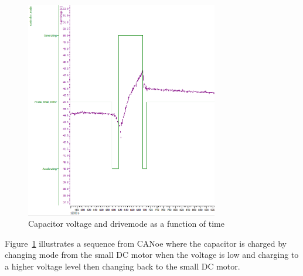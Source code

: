 \begin{figure}[H]
    \centering
    \includegraphics[width=0.75\textwidth]{./img/elba_capvoltage_regen}
    \caption{Capacitor voltage and drivemode as a function of time}\label{fig:elba_capvoltage_regen}
\end{figure}

Figure~\ref{fig:elba_capvoltage_regen} illustrates a sequence from CANoe where the capacitor is charged by changing mode from the small DC motor when the voltage is low and charging to a higher voltage level then changing back to the small DC motor.

